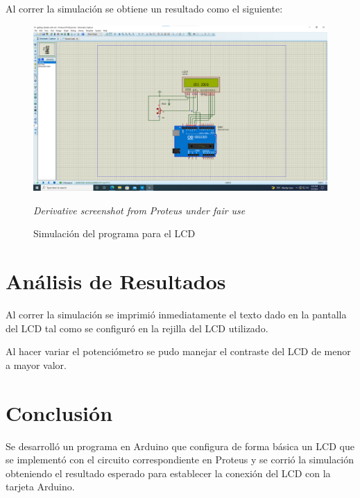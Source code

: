 \documentclass{article}
\begin{document}
    \bigbreak

    Al correr la simulación se obtiene un resultado como el siguiente:

    \begin{figure}[H]
        \centering
        \includegraphics[width=0.6\paperwidth]{images/sim-running.png}
        \caption{Simulación del programa para el LCD}\footnotesize
        \textit{Derivative screenshot from Proteus under fair use}
    \end{figure}

    \section{Análisis de Resultados}

    Al correr la simulación se imprimió inmediatamente el texto dado en la pantalla del LCD tal como se configuró en la rejilla del LCD utilizado.

    \bigbreak

    Al hacer variar el potenciómetro se pudo manejar el contraste del LCD de menor a mayor valor.

    \section{Conclusión}

    Se desarrolló un programa en Arduino que configura de forma básica un LCD que se implementó con el circuito correspondiente en Proteus y se corrió la simulación obteniendo el resultado esperado para establecer la conexión del LCD con la tarjeta Arduino.

    \printbibliography
\end{document}
